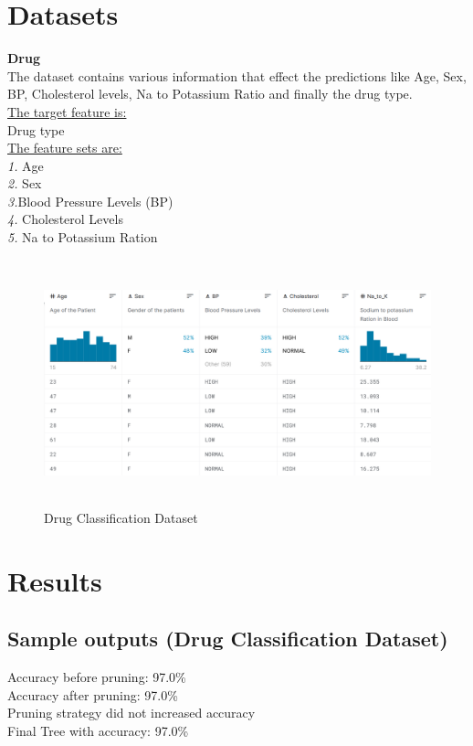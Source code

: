\documentclass[conference,compsoc]{IEEEtran}
\begin{document}
\section{Datasets }
\large{\textbf{Drug}}\\
The dataset contains various information that effect the predictions like Age, Sex, BP, Cholesterol levels, Na to Potassium Ratio and finally the drug type. \\

\underline{The target feature is:}
\\ \textendash Drug type\\

\underline{The feature sets are:}\\
   \textit{1.} Age\\
   \textit{2.} Sex\\
    \textit{3.}Blood Pressure Levels (BP)\\
   \textit{4.} Cholesterol Levels\\
   \textit{5.} Na to Potassium Ration\\
   
\begin{figure}[H]
\centering
\includegraphics[width=6in,height=2.8in]{drug dataset.PNG}

\caption{Drug Classification Dataset }
\label{fig_error}

\end{figure}  


\section{Results}

 \subsection{Sample outputs (Drug Classification Dataset)}
 \textendash Accuracy before pruning: 97.0\%
\\\textendash Accuracy after pruning: 97.0\%
 \\Pruning strategy did not increased accuracy
 \\\textendash Final Tree with accuracy: 97.0\%
 


 
 
\end{document}
